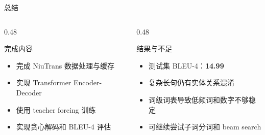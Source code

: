 \documentclass[aspectratio=169,10pt]{ctexbeamer}
\begin{document}
\begin{frame}{总结}
	\begin{columns}[T,onlytextwidth]
		\begin{column}{0.48\textwidth}
			\begin{block}{完成内容}
				\begin{itemize}
					\item 完成 NiuTrans 数据处理与缓存
					\item 实现 Transformer Encoder-Decoder
					\item 使用 teacher forcing 训练
					\item 实现贪心解码和 BLEU-4 评估
				\end{itemize}
			\end{block}
		\end{column}
		\begin{column}{0.48\textwidth}
			\begin{block}{结果与不足}
				\begin{itemize}
					\item 测试集 BLEU-4：\textbf{14.99}
					\item 复杂长句仍有实体关系混淆
					\item 词级词表导致低频词和数字不够稳定
					\item 可继续尝试子词分词和 beam search
				\end{itemize}
			\end{block}
		\end{column}
	\end{columns}
\end{frame}
\end{document}
